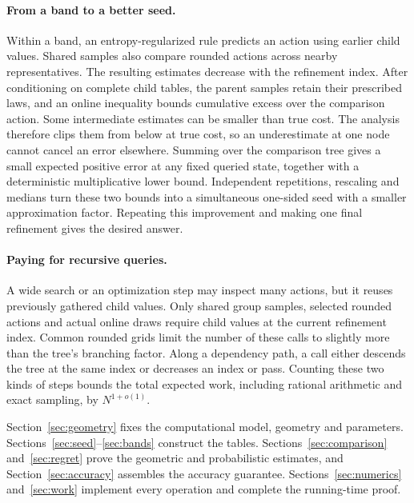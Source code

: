 \paragraph{From a band to a better seed.}
Within a band, an entropy-regularized rule predicts an action using earlier
child values. Shared samples also compare rounded actions across nearby
representatives. The resulting estimates decrease with the refinement
index. After conditioning on complete child tables, the parent samples
retain their prescribed laws, and an online inequality bounds cumulative
excess over the comparison action.
Some intermediate estimates can be smaller than true cost. The analysis
therefore clips them from below at true cost, so an underestimate at one
node cannot cancel an error elsewhere. Summing
over the comparison tree gives a small expected positive error at any
fixed queried state, together with a deterministic multiplicative lower
bound. Independent repetitions, rescaling and medians turn these two
bounds into a simultaneous one-sided seed with a smaller approximation
factor. Repeating this improvement and making one final refinement gives
the desired answer.

\paragraph{Paying for recursive queries.}
A wide search or an optimization step may inspect many actions, but it
reuses previously gathered child values. Only shared group samples,
selected rounded actions and actual online draws require child values
at the current refinement index. Common rounded grids limit the number
of these calls to slightly more than the tree's branching factor.
Along a dependency path, a call either descends the tree at the same
index or decreases an index or pass. Counting these two kinds of steps
bounds the total expected work, including rational arithmetic and exact
sampling, by $N^{1+o(1)}$.

Section~\ref{sec:geometry} fixes the computational model, geometry and
parameters. Sections~\ref{sec:seed}--\ref{sec:bands} construct the tables.
Sections~\ref{sec:comparison} and~\ref{sec:regret} prove the geometric and
probabilistic estimates, and Section~\ref{sec:accuracy} assembles the
accuracy guarantee. Sections~\ref{sec:numerics} and~\ref{sec:work} implement
every operation and complete the running-time proof.
